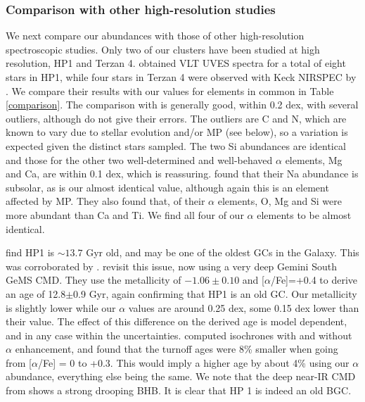 \documentclass[onecolumn]{aa}
\begin{document}
\subsubsection{Comparison with other high-resolution studies}
	  
We next compare our abundances with those of other high-resolution spectroscopic studies. Only two of our clusters have been studied at high resolution,
HP1 and Terzan 4. \citet{Barbuy2006, Barbuy2016} obtained VLT UVES spectra for a total of eight stars in HP1, while four stars in Terzan 4 were observed with Keck NIRSPEC by \citet{Origlia2004}. We compare their results with our values for elements in common in Table \ref{comparison}.
The comparison with \cite{Barbuy2016} is generally good, within 0.2 dex, with several outliers, although \cite{Barbuy2016} do not give their errors. The outliers are C and N, which are known to vary due to stellar evolution and/or MP (see below), so a variation is expected given the distinct stars sampled. The two Si abundances are identical and those for the other two well-determined and well-behaved $\alpha$ elements, Mg and Ca, are within 0.1 dex, which is reassuring. \cite{Barbuy2016} found that their Na abundance is subsolar, as is our almost identical value, although again this is an element affected by MP. They also found that, of their $\alpha$ elements, O, Mg and Si were more abundant than Ca and Ti. We find all four of our $\alpha$ elements to be almost identical. 

\citet{Ortolani2011} find HP1 is $\sim13.7$ Gyr old, and may be one of the oldest
GCs in the Galaxy. This was corroborated by \citet{Dias2016}. \citet{Kerber2019} revisit this issue, now using a very deep Gemini South GeMS CMD. They use the \cite{Barbuy2016} metallicity of $-1.06\pm0.10$ and [$\alpha$/Fe]=+0.4 to derive an age of 12.8$\pm$0.9 Gyr, again confirming that HP1 is an old GC.
Our metallicity is slightly lower while our $\alpha$ values are around 0.25 dex, some 0.15 dex lower than their value. The effect of this difference on the derived age is model dependent, and in any case within the uncertainties. \citet{Kim2002} computed isochrones with and without $\alpha$ enhancement, and found
that the turnoff ages were 8\% smaller when going from [$\alpha$/Fe] = 0 to +0.3. %
This would imply a higher age by 
about 4\% using our $\alpha$ abundance, everything else being the same. We note that the deep near-IR CMD from \citet{Cohen2018} shows a strong drooping BHB.
It is clear that HP 1 is indeed an old BGC.
\end{document}
